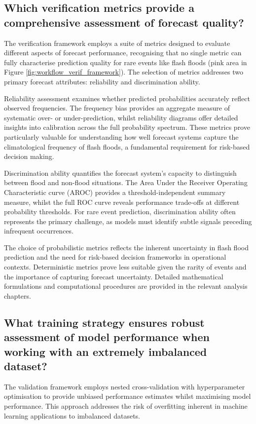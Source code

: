 \subsection{Which verification metrics provide a comprehensive assessment of forecast quality?}

The verification framework employs a suite of metrics designed to evaluate different aspects of forecast performance, recognising that no single metric can fully characterise prediction quality for rare events like flash floods (pink area in Figure \ref{fig:workflow_verif_framework}). The selection of metrics addresses two primary forecast attributes: reliability and discrimination ability.

Reliability assessment examines whether predicted probabilities accurately reflect observed frequencies. The frequency bias provides an aggregate measure of systematic over- or under-prediction, whilst reliability diagrams offer detailed insights into calibration across the full probability spectrum. These metrics prove particularly valuable for understanding how well forecast systems capture the climatological frequency of flash floods, a fundamental requirement for risk-based decision making.

Discrimination ability quantifies the forecast system's capacity to distinguish between flood and non-flood situations. The Area Under the Receiver Operating Characteristic curve (AROC) provides a threshold-independent summary measure, whilst the full ROC curve reveals performance trade-offs at different probability thresholds. For rare event prediction, discrimination ability often represents the primary challenge, as models must identify subtle signals preceding infrequent occurrences.

The choice of probabilistic metrics reflects the inherent uncertainty in flash flood prediction and the need for risk-based decision frameworks in operational contexts. Deterministic metrics prove less suitable given the rarity of events and the importance of capturing forecast uncertainty. Detailed mathematical formulations and computational procedures are provided in the relevant analysis chapters.


\subsection{What training strategy ensures robust assessment of model performance when working with an extremely imbalanced dataset?}

The validation framework employs nested cross-validation with hyperparameter optimisation to provide unbiased performance estimates whilst maximising model performance. This approach addresses the risk of overfitting inherent in machine learning applications to imbalanced datasets.

